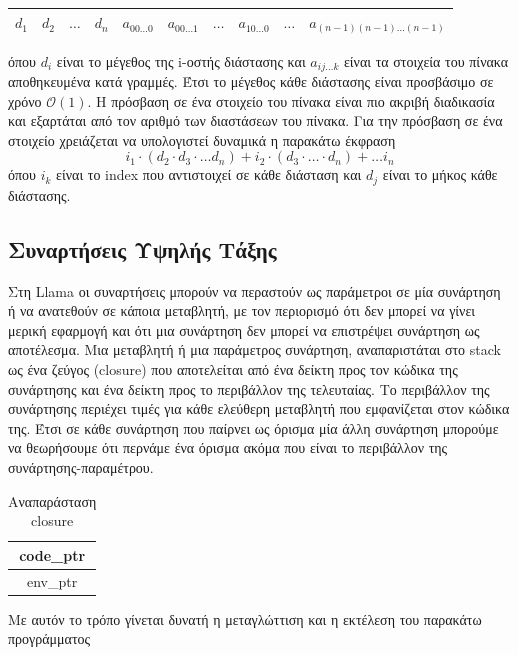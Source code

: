 \documentclass[12pt]{article}
\newcommand{\Llama}{\textsf{Llama }}
\begin{document}
\begin{table}[htbp]
\centering
    \begin{tabular}{|l|c|l|l|l|l|l|l|l|c|}
    \hline
    $d_1$ & $d_2$ & $\ldots$ & $d_n$ & $a_{00\ldots0}$ & $a_{00\ldots1}$ & $\ldots$ & $a_{10\ldots0}$ & $\ldots$ & $a_{(n-1)(n-1)\ldots(n-1)}$ \\ \hline
    \end{tabular}
\end{table}
όπου $d_i$ είναι το μέγεθος της i-οστής διάστασης και $a_{ij \ldots k}$ είναι τα στοιχεία του πίνακα αποθηκευμένα κατά γραμμές. Έτσι το μέγεθος κάθε διάστασης είναι προσβάσιμο σε χρόνο $\mathcal{O}(1)$. Η πρόσβαση σε ένα στοιχείο του πίνακα είναι πιο ακριβή διαδικασία και εξαρτάται από τον αριθμό των διαστάσεων του πίνακα. Για την πρόσβαση σε ένα στοιχείο χρειάζεται να υπολογιστεί δυναμικά η παρακάτω έκφραση
$$i_1 \cdot (d_2 \cdot d_3 \cdot \ldots d_n) + i_2 \cdot (d_3 \cdot \ldots \cdot d_n) + \ldots i_n$$
όπου $i_k$ είναι το index που αντιστοιχεί σε κάθε διάσταση και $d_j$ είναι το μήκος κάθε διάστασης.
\subsection{Συναρτήσεις Υψηλής Τάξης}
Στη \Llama οι συναρτήσεις μπορούν να περαστούν ως παράμετροι σε μία συνάρτηση ή να ανατεθούν σε κάποια μεταβλητή, με τον περιορισμό ότι δεν μπορεί να γίνει μερική εφαρμογή και ότι μια συνάρτηση δεν μπορεί να επιστρέψει συνάρτηση ως αποτέλεσμα. Μια μεταβλητή ή μια παράμετρος συνάρτηση, αναπαριστάται στο stack ως ένα ζεύγος (closure) που αποτελείται από ένα δείκτη προς τον κώδικα της συνάρτησης και ένα δείκτη προς το περιβάλλον της τελευταίας. Το περιβάλλον της συνάρτησης περιέχει τιμές για κάθε ελεύθερη μεταβλητή που εμφανίζεται στον κώδικα της. Έτσι σε κάθε συνάρτηση που παίρνει ως όρισμα μία άλλη συνάρτηση μπορούμε να θεωρήσουμε ότι περνάμε ένα όρισμα ακόμα που είναι το περιβάλλον της συνάρτησης-παραμέτρου.

\begin{table}[htbp]
\centering
    \begin{tabular}{|c|}
    \hline
    code\_ptr \\ \hline
    env\_ptr  \\ \hline
    \end{tabular}
    \caption{Αναπαράσταση closure}
\end{table}


Με αυτόν το τρόπο γίνεται δυνατή η μεταγλώττιση και η εκτέλεση του παρακάτω προγράμματος
\end{document}
